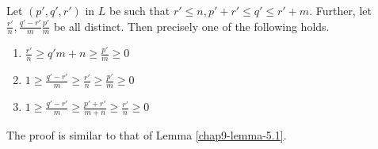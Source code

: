 \begin{seclem}\label{chap9-lemma-5.4}
Let $(p',q',r')$ in $L$ be such that $r' \leq n, p' + r' \leq q' \leq r' +m$.
Further, let $\frac{r'}{n}, \frac{q'-r'}{m} \frac{p'}{m}$ be all distinct. Then precisely one of the following holds.
\begin{enumerate}[(1)]
\item $\frac{r'}{n} \geq {q'}{m+n} \geq \frac{p'}{m} \geq 0$\label{chap9-lemma5.4-enum-1}

\item $1 \geq \frac{q'-r'}{m} \geq \frac{r'}{n} \geq \frac{p'}{m} \geq 0$\label{chap9-lemma5.4-enum-2}

\item $1 \geq \frac{q'-r'}{m} \geq \frac{p'+r'}{m+n} \geq \frac{r'}{n} \geq 0$\label{chap9-lemma5.4-enum-3}
\end{enumerate}
\end{seclem}
The proof is similar to that of Lemma \ref{chap9-lemma-5.1}.

\setcounter{subsection}{4}
